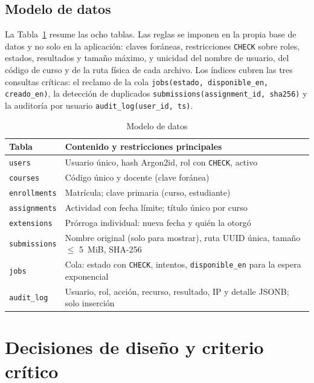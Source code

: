 \documentclass[conference,a4paper]{IEEEtran}
\newcommand{\cod}[1]{\texttt{#1}}
\begin{document}
\subsection{Modelo de datos}
La Tabla~\ref{tab:modelo} resume las ocho tablas. Las reglas se imponen en la propia base de datos y no solo en la aplicación: claves foráneas, restricciones \cod{CHECK} sobre roles, estados, resultados y tamaño máximo, y unicidad del nombre de usuario, del código de curso y de la ruta física de cada archivo. Los índices cubren las tres consultas críticas: el reclamo de la cola \cod{jobs(estado, disponible\_en, creado\_en)}, la detección de duplicados \cod{submissions(assignment\_id, sha256)} y la auditoría por usuario \cod{audit\_log(user\_id, ts)}.

\begin{table}[!t]
\caption{Modelo de datos}\label{tab:modelo}
\centering\footnotesize
\begin{tabular}{@{}l >{\raggedright\arraybackslash}p{5.3cm}@{}}
\toprule
Tabla & Contenido y restricciones principales\\
\midrule
\cod{users} & Usuario único, hash Argon2id, rol con \cod{CHECK}, activo\\
\cod{courses} & Código único y docente (clave foránea)\\
\cod{enrollments} & Matrícula; clave primaria (curso, estudiante)\\
\cod{assignments} & Actividad con fecha límite; título único por curso\\
\cod{extensions} & Prórroga individual: nueva fecha y quién la otorgó\\
\cod{submissions} & Nombre original (solo para mostrar), ruta UUID única, tamaño $\leq$ 5~MiB, SHA-256\\
\cod{jobs} & Cola: estado con \cod{CHECK}, intentos, \cod{disponible\_en} para la espera exponencial\\
\cod{audit\_log} & Usuario, rol, acción, recurso, resultado, IP y detalle JSONB; solo inserción\\
\bottomrule
\end{tabular}
\end{table}

\section{Decisiones de diseño y criterio crítico}\label{sec:decisiones}
\end{document}

